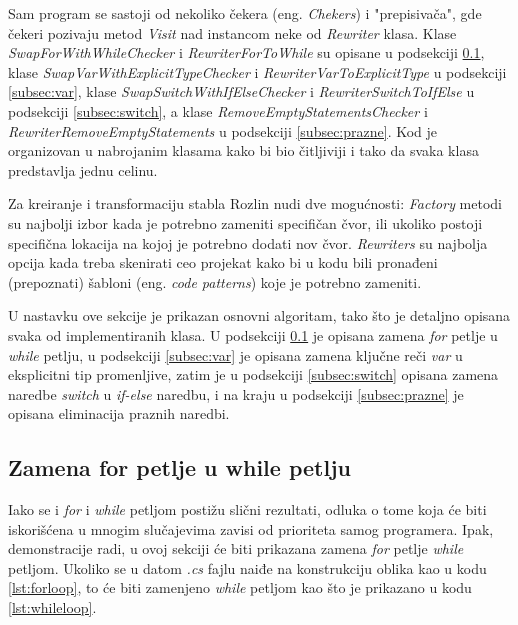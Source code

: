 \documentclass[a4paper]{article}
\begin{document}
{		Sam program se sastoji od nekoliko čekera (eng. \textit{Chekers}) i "prepisivača", gde čekeri pozivaju metod \textit{Visit} nad instancom neke od \textit{Rewriter} klasa. Klase \textit{SwapForWithWhileChecker} i \textit{RewriterForToWhile} su opisane u podsekciji \ref{subsec:for}, klase \textit{SwapVarWithExplicitTypeChecker} i \textit{RewriterVarToExplicitType} u podsekciji \ref{subsec:var}, klase \textit{SwapSwitchWithIfElseChecker} i \textit{RewriterSwitchToIfElse} u podsekciji \ref{subsec:switch}, a klase \textit{RemoveEmptyStatementsChecker} i \textit{RewriterRemoveEmptyStatements} u podsekciji \ref{subsec:prazne}. Kod je organizovan u nabrojanim klasama kako bi bio čitljiviji i tako da svaka klasa predstavlja jednu celinu.
		
		Za kreiranje i transformaciju stabla Rozlin nudi dve mogućnosti: \textit{Factory} metodi su najbolji izbor kada je potrebno zameniti specifičan čvor, ili ukoliko postoji specifična lokacija na kojoj je potrebno dodati nov čvor. \textit{Rewriters} su najbolja opcija kada treba skenirati ceo projekat kako bi u kodu bili pronađeni (prepoznati) šabloni (eng. \textit{code patterns}) koje je potrebno zameniti.
		
		U nastavku ove sekcije je prikazan osnovni algoritam, tako što je detaljno opisana svaka od implementiranih klasa. U podsekciji \ref{subsec:for} je opisana zamena \textit{for} petlje u \textit{while} petlju, u podsekciji \ref{subsec:var} je opisana zamena ključne reči \textit{var} u eksplicitni tip promenljive, zatim je u podsekciji \ref{subsec:switch} opisana zamena naredbe  \textit{switch} u \textit{if-else} naredbu, i na kraju u podsekciji \ref{subsec:prazne} je opisana eliminacija praznih naredbi.
		
		
		\subsection{Zamena for petlje u while petlju}
		\label{subsec:for}
		
		Iako se i \textit{for} i \textit{while} petljom postižu slični rezultati, odluka o tome koja će biti iskorišćena u mnogim slučajevima zavisi od prioriteta samog programera. Ipak, demonstracije radi, u ovoj sekciji će biti prikazana zamena \textit{for} petlje \textit{while} petljom. Ukoliko se u datom \textit{.cs} fajlu naiđe na konstrukciju oblika kao u kodu \ref{lst:forloop}, to će biti zamenjeno \textit{while} petljom kao što je prikazano u kodu \ref{lst:whileloop}.
		
}
\end{document}
